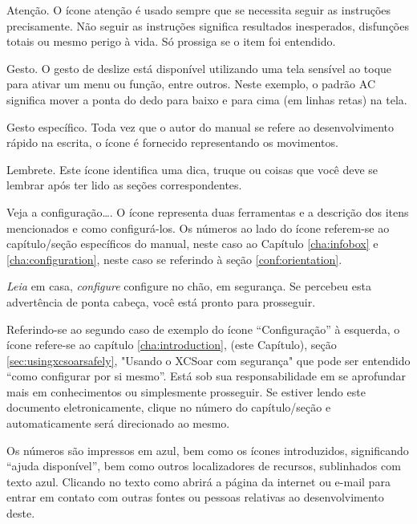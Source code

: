\warning Atenção.  O ícone atenção é usado sempre que se necessita seguir as instruções precisamente.   Não seguir as instruções significa resultados inesperados, disfunções totais ou mesmo perigo à vida.  Só prossiga se o item foi entendido.

 Gesto.  O gesto de deslize está disponível utilizando uma tela sensível ao toque para ativar um menu ou função, entre outros.  Neste exemplo, o padrão AC significa mover a ponta do dedo para baixo e para cima (em linhas retas) na tela.
  
 Gesto específico.  Toda vez que o autor do manual se refere ao desenvolvimento rápido na escrita, o ícone é fornecido representando os movimentos.

\tip Lembrete. Este ícone identifica uma dica, truque ou coisas que você deve se lembrar após ter lido as seções correspondentes.

 Veja a configuração…. O ícone representa duas ferramentas e a descrição dos itens mencionados e como configurá-los.  Os números ao lado do ícone referem-se ao capítulo/seção específicos do manual, neste caso ao Capítulo \ref{cha:infobox} e \ref{cha:configuration}, neste caso se referindo à seção \ref{conf:orientation}. 


\emph{Leia} em casa, \emph{configure} configure no chão, em segurança.  Se percebeu esta advertência de ponta cabeça, você está pronto para prosseguir.

 Referindo-se ao segundo caso de exemplo do ícone “Configuração” à esquerda, o ícone refere-se ao capítulo \ref{cha:introduction}, (este Capítulo), seção 
\ref{sec:usingxcsoarsafely}, "Usando o XCSoar com segurança" que pode ser entendido “como configurar por si mesmo”.  Está sob sua responsabilidade em se aprofundar mais em conhecimentos ou simplesmente prosseguir.  Se estiver lendo este documento eletronicamente, clique no número do capítulo/seção e automaticamente será direcionado ao mesmo.  

Os números são impressos em azul, bem como os ícones introduzidos, significando “ajuda disponível”, bem como outros localizadores de recursos, sublinhados com texto azul. Clicando no texto como   abrirá a página da internet ou e-mail para entrar em contato com outras fontes ou pessoas relativas ao desenvolvimento deste.


